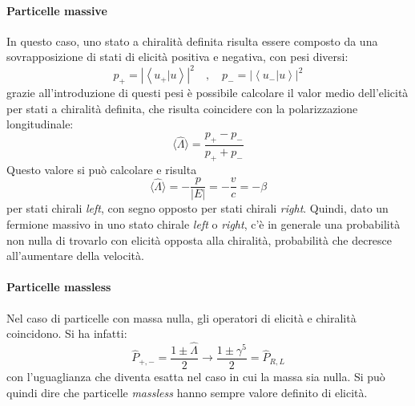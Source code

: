 \documentclass{subnucbo}
\begin{document}
\paragraph{Particelle massive} In questo caso, uno stato a chiralità definita risulta essere composto da una sovrapposizione di stati di elicità positiva e negativa, con pesi diversi:
\begin{equation}
        p_{+} = \left| \left\langle u _ { + } | u \right\rangle \right| ^ { 2 } \quad , \quad p_{-} = \left| \left\langle u _ { - } | u \right\rangle \right| ^ { 2 }
\end{equation}
grazie all'introduzione di questi pesi è possibile calcolare il valor medio dell'elicità per stati a chiralità definita, che risulta coincidere con la polarizzazione longitudinale:
\begin{equation}
        \langle \hat{\Lambda} \rangle = \frac { p_{+} - p_{-}} { p_{+} + p_{-} }
        \label{eq:mean_value_helicity}
\end{equation}
Questo valore si può calcolare e risulta
\begin{equation}
        \langle \hat{\Lambda} \rangle = - \frac { p } { | E | } = - \frac { v } { c } = - \beta
\end{equation}
per stati chirali \textit{left}, con segno opposto per stati chirali \textit{right}. Quindi, dato un fermione massivo in uno stato chirale \textit{left} o \textit{right}, c'è in generale una probabilità non nulla di trovarlo con elicità opposta alla chiralità, probabilità che decresce all'aumentare della velocità.
\paragraph{Particelle massless} Nel caso di particelle con massa nulla, gli operatori di elicità e chiralità coincidono.
Si ha infatti:
\begin{equation}
        \hat{P} _ { +,- } = \frac { 1 \pm \hat{\Lambda}} { 2 } \rightarrow \frac { 1 \pm \gamma ^ { 5 } } { 2 } = \hat{P} _ { R , L }
\end{equation}
con l'uguaglianza che diventa esatta nel caso in cui la massa sia nulla. Si può quindi dire che particelle \textit{massless} hanno sempre valore definito di elicità.
\end{document}
